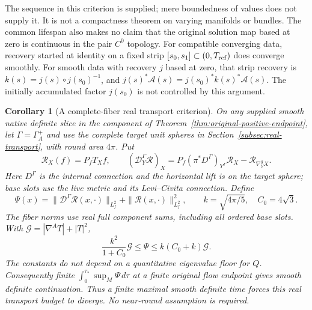 \documentclass[11pt]{article}
\numberwithin{equation}{section}
\newtheorem{corollary}[theorem]{Corollary}
\theoremstyle{definition}
\theoremstyle{remark}
\begin{document}
The sequence in this criterion is supplied; mere
boundedness of values does not supply it. It is
not a compactness theorem on varying manifolds or
bundles. The common lifespan also makes no claim
that the original solution map based at zero is
continuous in the pair \(C^0\) topology.
For compatible converging data, recovery started at
identity on a fixed strip
\([s_0,s_1]\subset(0,T_{\rm ref})\) does converge smoothly.
For smooth data with recovery \(j\) based at zero, that strip recovery
is \(k(s)=j(s)\circ j(s_0)^{-1}\), and
\(j(s)^*\mathcal A(s)=j(s_0)^*k(s)^*\mathcal A(s)\).
The initially accumulated factor \(j(s_0)\) is
not controlled by this argument.


\begin{corollary}[A complete-fiber real transport criterion]
\label{cor:real-transport-continuation}
On any supplied smooth native definite slice in the component
of Theorem~\ref{thm:original-positive-endpoint}, let
\(\Gamma=\Gamma_A^+\) and use the complete target unit
spheres in Section~\ref{subsec:real-transport}, with round
area \(4\pi\). Put
\[
 \mathcal R_X(f)=P_fT_Xf,\qquad
 (\mathcal D^\Gamma_Y\mathcal R)_X
 =P_f(\pi^*D^\Gamma)_{Y^\Gamma}\mathcal R_X
                          -\mathcal R_{\nabla^g_YX}.
\]
Here \(D^\Gamma\) is the internal connection and the
horizontal lift is on the target sphere; base slots use
the live metric and its Levi--Civita connection. Define
\[
 \Psi(x)=\|\mathcal D^\Gamma\mathcal R(x,\cdot)\|_{L^2_f}
                  +\|\mathcal R(x,\cdot)\|_{L^2_f}^2,\qquad
 k=\sqrt{4\pi/5},\quad C_0=4\sqrt3 .
\]
The fiber norms use real full component sums, including
all ordered base slots. With \(\mathcal G=|\nabla^AT|+|T|^2\),
\begin{equation}\label{eq:real-temporal-equivalence}
 \frac{k^2}{1+C_0}\mathcal G\le\Psi
                         \le k(C_0+k)\mathcal G .
\end{equation}
The constants do not depend on a quantitative eigenvalue
floor for \(Q\). Consequently finite
\(\int_0^{\tau_*}\sup_M\Psi\,d\tau\) at a finite original
flow endpoint gives smooth definite continuation.
Thus a finite maximal smooth definite time forces
this real transport budget to diverge.
No near-round assumption is required.
\end{corollary}
\end{document}
